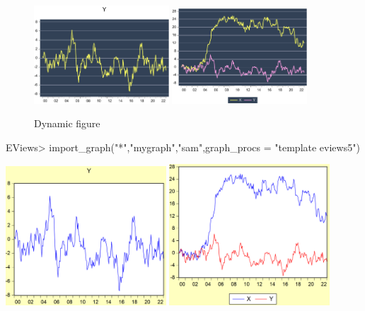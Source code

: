 \documentclass[
]{article}
\newenvironment{Shaded}{\begin{snugshade}}{\end{snugshade}}
\newcommand{\AttributeTok}[1]{\textcolor[rgb]{0.77,0.63,0.00}{#1}}
\newcommand{\FunctionTok}[1]{\textcolor[rgb]{0.00,0.00,0.00}{#1}}
\newcommand{\NormalTok}[1]{#1}
\newcommand{\SpecialCharTok}[1]{\textcolor[rgb]{0.00,0.00,0.00}{#1}}
\newcommand{\StringTok}[1]{\textcolor[rgb]{0.31,0.60,0.02}{#1}}
\begin{document}
\begin{figure}[h]

{\centering \includegraphics[width=0.45\textwidth]{test_engEviews_files/figure-latex//sagirumati-sam-eviewsr_graph} \includegraphics[width=0.45\textwidth]{test_engEviews_files/figure-latex//sagirumati-sam-graph1} 

}

\caption{Dynamic figure}\label{fig:sagirumati}
\end{figure}

\begin{Shaded}
\begin{Highlighting}[]
\NormalTok{EViews}\SpecialCharTok{\textgreater{}} \FunctionTok{import\_graph}\NormalTok{(}\StringTok{"*"}\NormalTok{,}\StringTok{"mygraph"}\NormalTok{,}\StringTok{"sam"}\NormalTok{,}\AttributeTok{graph\_procs =} \StringTok{"template eviews5"}\NormalTok{)}
\end{Highlighting}
\end{Shaded}

\includegraphics[width=0.45\textwidth]{test_engEviews_files/figure-latex//grap-EVIEWSR_GRAPH} \includegraphics[width=0.45\textwidth]{test_engEviews_files/figure-latex//grap-GRAPH1}
\end{document}
